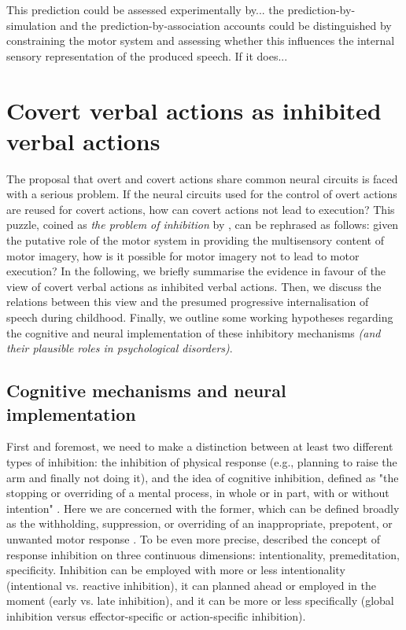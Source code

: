 \documentclass[utf8]{template/frontiersSCNS} %
\begin{document}
This prediction could be assessed experimentally by... the prediction-by-simulation and the prediction-by-association accounts could be distinguished by constraining the motor system and assessing whether this influences the internal sensory representation of the produced speech. If it does...

\section{Covert verbal actions as inhibited verbal actions}

The proposal that overt and covert actions share common neural circuits is faced with a serious problem. If the neural circuits used for the control of overt actions are reused for covert actions, how can covert actions not lead to execution? This puzzle, coined as \textit{the problem of inhibition} by \cite{jeannerod_neural_2001}, can be rephrased as follows: given the putative role of the motor system in providing the multisensory content of motor imagery, how is it possible for motor imagery not to lead to motor execution? In the following, we briefly summarise the evidence in favour of the view of covert verbal actions as inhibited verbal actions. Then, we discuss the relations between this view and the presumed progressive internalisation of speech during childhood. Finally, we outline some working hypotheses regarding the cognitive and neural implementation of these inhibitory mechanisms \textit{(and their plausible roles in psychological disorders)}.

\subsection{Cognitive mechanisms and neural implementation}

First and foremost, we need to make a distinction between at least two different types of inhibition: the inhibition of physical response (e.g., planning to raise the arm and finally not doing it), and the idea of cognitive inhibition, defined as "the stopping or overriding of a mental process, in whole or in part, with or without intention" \citep{gorfein_concept_2007}. Here we are concerned with the former, which can be defined broadly as the withholding, suppression, or overriding of an inappropriate, prepotent, or unwanted motor response \citep{aron_neural_2007, oshea_go_2018}. To be even more precise, \cite{ridderinkhof_dont_2014} described the concept of response inhibition on three continuous dimensions: intentionality, premeditation, specificity. Inhibition can be employed with more or less intentionality (intentional vs. reactive inhibition), it can planned ahead or employed in the moment (early vs. late inhibition), and it can be more or less specifically (global inhibition versus effector-specific or action-specific inhibition).
\end{document}
